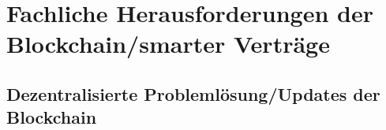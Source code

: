 \chapter{Fachliche Herausforderungen der Blockchain/smarter Verträge}
\section{Dezentralisierte Problemlösung/Updates der Blockchain}
\cite{Hearn.2016}